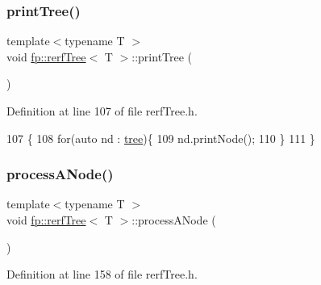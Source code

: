\subsubsection{\texorpdfstring{print\+Tree()}{printTree()}}
{\footnotesize\ttfamily template$<$typename T $>$ \\
void \hyperlink{classfp_1_1rerfTree}{fp\+::rerf\+Tree}$<$ T $>$\+::print\+Tree (\begin{DoxyParamCaption}{ }\end{DoxyParamCaption})\hspace{0.3cm}{\ttfamily [inline]}}



Definition at line 107 of file rerf\+Tree.\+h.


\begin{DoxyCode}
107                                 \{
108                     \textcolor{keywordflow}{for}(\textcolor{keyword}{auto} nd : \hyperlink{classfp_1_1rerfTree_afc9392154cb4d1dde02e26a9ec31e356}{tree})\{
109                         nd.printNode();
110                     \}
111                 \}
\end{DoxyCode}
\mbox{\label{classfp_1_1rerfTree_a69c175640d930d630504875e60b3b780}} 
\subsubsection{\texorpdfstring{process\+A\+Node()}{processANode()}}
{\footnotesize\ttfamily template$<$typename T $>$ \\
void \hyperlink{classfp_1_1rerfTree}{fp\+::rerf\+Tree}$<$ T $>$\+::process\+A\+Node (\begin{DoxyParamCaption}{ }\end{DoxyParamCaption})\hspace{0.3cm}{\ttfamily [inline]}}



Definition at line 158 of file rerf\+Tree.\+h.


